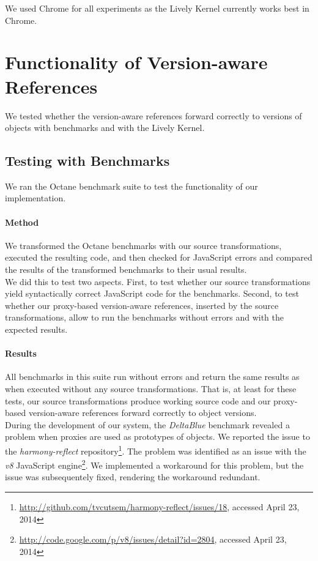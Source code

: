 We used Chrome for all experiments as the Lively Kernel currently works best in Chrome.



\section{Functionality of Version-aware References} \label{sec:EVALUATION:2}

We tested whether the version-aware references forward correctly to versions of objects with benchmarks and with the Lively Kernel.

\subsection{Testing with Benchmarks}

We ran the Octane benchmark suite to test the functionality of our implementation.

\paragraph{Method}
We transformed the Octane benchmarks with our source transformations, executed the resulting code, and then checked for JavaScript errors and compared the results of the transformed benchmarks to their usual results.\\
We did this to test two aspects.
First, to test whether our source transformations yield syntactically correct JavaScript code for the benchmarks.
Second, to test whether our proxy-based version-aware references, inserted by the source transformations, allow to run the benchmarks without errors and with the expected results.


\paragraph{Results}
All benchmarks in this suite run without errors and return the same results as when executed without any source transformations.
That is, at least for these tests, our source transformations produce working source code and our proxy-based version-aware references forward correctly to object versions.\\
During the development of our system, the \emph{DeltaBlue} benchmark revealed a problem when proxies are used as prototypes of objects.
We reported the issue to the \emph{harmony-reflect} repository\footnote{\url{http://github.com/tvcutsem/harmony-reflect/issues/18}, accessed April 23, 2014}.
The problem was identified as an issue with the \emph{v8} JavaScript engine\footnote{\url{http://code.google.com/p/v8/issues/detail?id=2804}, accessed April 23, 2014}.
We implemented a workaround for this problem, but the issue was subsequentely fixed, rendering the workaround redundant.

